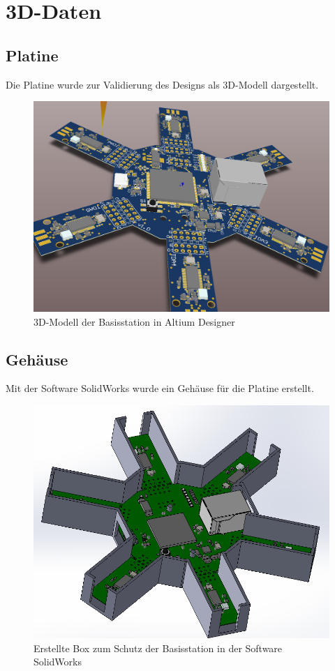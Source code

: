 \section{3D-Daten}
\label{app:3D}
\subsection{Platine}
Die Platine wurde zur Validierung des Designs als 3D-Modell dargestellt.
\begin{figure}[h] 
	\centering
	\includegraphics[width=\textwidth]{Abbildungen/Aufnahmen/Bilder/Altium/3D2}
	\caption{3D-Modell der Basisstation in Altium Designer}
	\label{fig:3D}
\end{figure}
\subsection{Gehäuse}
\label{app:Gehäuse}
Mit der Software SolidWorks wurde ein Gehäuse für die Platine erstellt.
\begin{figure}[h]
\centering
\includegraphics[width=\linewidth]{Abbildungen/Aufnahmen/Bilder/SolidWorks/BoxBildschirmSW}
\caption{Erstellte Box zum Schutz der Basisstation in der Software SolidWorks}
\label{fig:boxbildschirmsw}
\end{figure}




